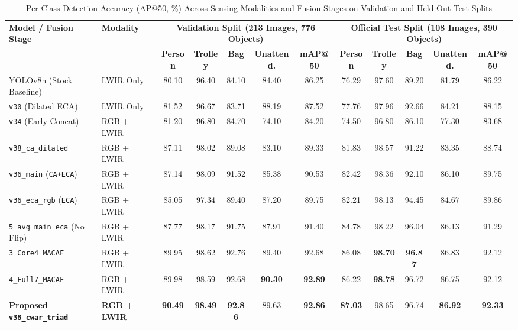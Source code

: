 \documentclass[journal,twoside,web]{ieeecolor}
\begin{document}
\begin{table}[t]
\centering
\caption{Per-Class Detection Accuracy (AP@50, \%) Across Sensing Modalities and Fusion Stages on Validation and Held-Out Test Splits}
\label{tab:per_class_multimodal}
\small
\renewcommand{\arraystretch}{1.20}
\setlength{\tabcolsep}{6pt}
\begin{tabular}{l l cccc c cccc c}
\toprule
\multirow{2}{*}{\textbf{Model / Fusion Stage}} & 
\multirow{2}{*}{\textbf{Modality}} & 
\multicolumn{5}{c}{\textbf{Validation Split (213 Images, 776 Objects)}} & 
\multicolumn{5}{c}{\textbf{Official Test Split (108 Images, 390 Objects)}} \\
\cmidrule(lr){3-7} \cmidrule(lr){8-12}
& & \textbf{Person} & \textbf{Trolley} & \textbf{Bag} & \textbf{Unattend.} & \textbf{mAP@50}
  & \textbf{Person} & \textbf{Trolley} & \textbf{Bag} & \textbf{Unattend.} & \textbf{mAP@50} \\
\midrule
YOLOv8n (Stock Baseline)       & LWIR Only     & 80.10 & 96.40 & 84.10 & 84.40 & 86.25 & 76.29 & 97.60 & 89.20 & 81.79 & 86.22 \\
\texttt{v30} (Dilated ECA)     & LWIR Only     & 81.52 & 96.67 & 83.71 & 88.19 & 87.52 & 77.76 & 97.96 & 92.66 & 84.21 & 88.15 \\
\texttt{v34} (Early Concat)    & RGB + LWIR    & 81.20 & 96.80 & 84.70 & 74.10 & 84.20 & 74.50 & 96.80 & 86.10 & 77.30 & 83.68 \\
\midrule
\texttt{v38\_ca\_dilated}      & RGB + LWIR    & 87.11 & 98.02 & 89.08 & 83.10 & 89.33 & 81.83 & 98.57 & 91.22 & 83.35 & 88.74 \\
\texttt{v36\_main} (\texttt{CA+ECA}) & RGB + LWIR & 87.14 & 98.09 & 91.52 & 85.38 & 90.53 & 82.42 & 98.36 & 92.10 & 86.10 & 89.75 \\
\texttt{v36\_eca\_rgb} (\texttt{ECA})& RGB + LWIR & 85.05 & 97.34 & 89.40 & 87.20 & 89.75 & 82.21 & 98.13 & 94.45 & 84.67 & 89.86 \\
\midrule
\texttt{5\_avg\_main\_eca} (No Flip) & RGB + LWIR & 87.77 & 98.17 & 91.75 & 87.91 & 91.40 & 84.78 & 98.22 & 96.04 & 86.13 & 91.29 \\
\texttt{3\_Core4\_MACAF}       & RGB + LWIR    & 89.95 & 98.62 & 92.76 & 89.40 & 92.68 & 86.08 & \textbf{98.70} & \textbf{96.87} & 86.83 & 92.12 \\
\texttt{4\_Full7\_MACAF}       & RGB + LWIR    & 89.98 & 98.59 & 92.68 & \textbf{90.30} & \textbf{92.89} & 86.22 & \textbf{98.78} & 96.72 & 86.75 & 92.12 \\
\rowcolor{gray!14}
\textbf{Proposed \texttt{v38\_cwar\_triad}} & \textbf{RGB + LWIR} & \textbf{90.49} & \textbf{98.49} & \textbf{92.86} & 89.63 & \textbf{92.86} & \textbf{87.03} & 98.65 & 96.74 & \textbf{86.92} & \textbf{92.33} \\

\end{tabular}
\end{table}
\end{document}
